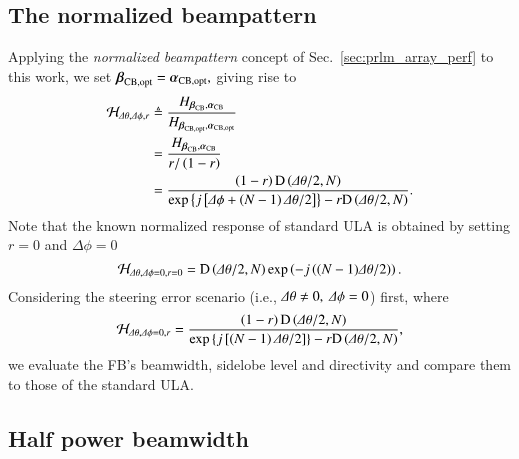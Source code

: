 \subsection{The normalized beampattern}
\label{subsection_spatialIIR_normBP}
Applying the \emph{normalized beampattern} concept of Sec.~\ref{sec:prlm_array_perf} to this work, we set $\boldsymbol{\beta}_{\text{CB},\text{opt}}=\boldsymbol{\alpha}_{\text{CB},\text{opt}},$ giving rise to
\begin{equation}
    \label{eq_narmalized_pattern}
    \begin{split}
        \mathcal{H}_{\Delta\theta,\Delta\phi,r}&\triangleq
        \frac{
        H_{\boldsymbol{\beta}_{\text{CB}},\boldsymbol{\alpha}_{\text{CB}}}
        }{
        H_{\boldsymbol{\beta}_{\text{CB},\text{opt}},\boldsymbol{\alpha}_{\text{CB},\text{opt}}}
        }\\
        &=
        \frac{
        H_{\boldsymbol{\beta}_{\text{CB}},\boldsymbol{\alpha}_{\text{CB}}}
        }{
        r/\left({1-r}\right)
        }\\
        &=
        \frac{\left({1-r}\right)\text{D}\left({\Delta\theta/2,N}\right)}{\exp\left\{{j\left[{\Delta\phi+\left({N-1}\right)\Delta\theta/2}\right]}\right\}-r\text{D}\left({\Delta\theta/2,N}\right)}.
    \end{split}
\end{equation}
Note that the known \cite{van2004optimum} normalized response of standard ULA is obtained by setting $r=0$ and $\Delta\phi=0$
$$
\mathcal{H}_{\Delta\theta,\Delta\phi=0,r=0}=
             \text{D}\left({\Delta\theta/2,N}\right)\exp\left({-j\left({(N-1)\Delta\theta/2}\right)}\right).
$$
Considering the steering error scenario (i.e., $\Delta\theta\neq0,\ \Delta\phi=0$) first, where 
\begin{equation}\label{eq_Hdphi0}
\mathcal{H}_{\Delta\theta,\Delta\phi=0,r}=
             \frac{\left({1-r}\right)\text{D}\left({\Delta\theta/2,N}\right)}{\exp\left\{{j\left[{\left({N-1}\right)\Delta\theta/2}\right]}\right\}-r\text{D}\left({\Delta\theta/2,N}\right)},
\end{equation}
we evaluate the FB's beamwidth, sidelobe level and directivity and compare them to those of the standard ULA.
\subsection{Half power beamwidth}

